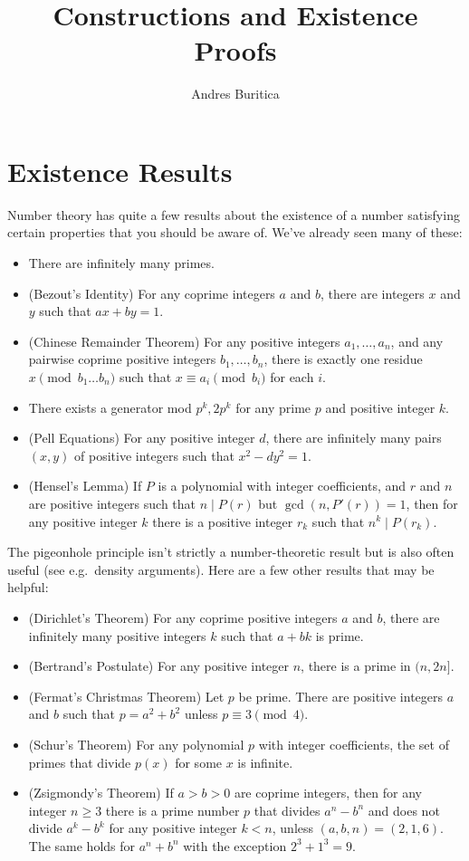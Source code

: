 \documentclass{article}
\title{Constructions and Existence Proofs}
\author{Andres Buritica}
\date{}
\begin{document}
\maketitle
\section{Existence Results}
Number theory has quite a few results about the existence of a number satisfying
certain properties that you should be aware of. We've already seen many of
these:
\begin{itemize}
  \item There are infinitely many primes.
  \item (Bezout's Identity)
    For any coprime integers $a$ and $b$, there are integers $x$ and $y$ such
    that $ax+by=1$.
  \item (Chinese Remainder Theorem)
    For any positive integers $a_1,\ldots,a_n$, and any pairwise coprime positive
    integers $b_1,\ldots,b_n$, there is exactly one residue $x\pmod {b_1\ldots
    b_n}$ such that $x\equiv a_i\pmod{b_i}$ for each $i$.
  \item There exists a generator mod $p^k,2p^k$ for any prime $p$ and positive
    integer $k$.
  \item (Pell Equations) For any positive integer $d$, there are infinitely many
    pairs $(x,y)$ of positive integers such that $x^2-dy^2=1$.
  \item (Hensel's Lemma) If $P$ is a polynomial with integer coefficients, and
    $r$ and $n$ are positive integers such that $n\mid P(r)$ but
    $\gcd(n,P'(r))=1$, then for any positive integer $k$ there is a positive
    integer $r_k$ such that $n^k\mid P(r_k)$.
\end{itemize}
The pigeonhole principle isn't strictly a number-theoretic result but is also
often useful (see e.g.\ density arguments).
Here are a few other results that may be helpful:
\begin{itemize}
  \item (Dirichlet's Theorem)
    For any coprime positive integers $a$ and $b$, there are infinitely many
    positive integers $k$ such that $a+bk$ is prime.
  \item (Bertrand's Postulate)
    For any positive integer $n$, there is a prime in $(n,2n]$. %
  \item (Fermat's Christmas Theorem) Let $p$ be prime. There are positive
    integers $a$ and $b$ such that $p=a^2+b^2$ unless $p\equiv 3\pmod 4$.
  \item (Schur's Theorem) For any polynomial $p$ with integer coefficients, the
    set of primes that divide $p(x)$ for some $x$ is infinite.
  \item (Zsigmondy's Theorem) If $a>b>0$ are coprime integers, then for any
    integer $n\ge 3$ there is a prime number $p$ that divides $a^n-b^n$ and does
    not divide $a^k-b^k$ for any positive integer $k<n$, unless
    $(a,b,n)=(2,1,6)$. The same holds for $a^n+b^n$ with the exception
    $2^3+1^3=9$.
\end{itemize}
\end{document}
